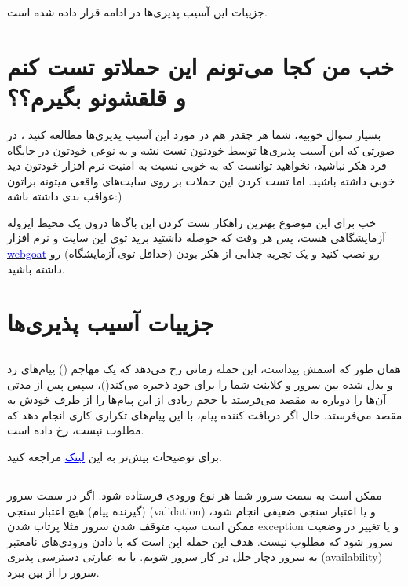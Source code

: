 \documentclass[]{article}
\begin{document}
جزییات این آسیب پذیری‌ها در ادامه قرار داده شده است.




\section*{{\titr خب من کجا می‌تونم این حملاتو تست کنم و قلقشونو بگیرم؟؟}} 

بسیار سوال خوبیه، شما هر چقدر هم در مورد این آسیب پذیری‌ها مطالعه کنید ، در صورتی که این آسیب پذیری‌ها توسط خودتون تست نشه و به نوعی خودتون در جایگاه فرد هکر نباشید، نخواهید توانست که به خوبی نسبت به امنیت نرم افزار خودتون دید خوبی داشته باشید. اما تست کردن این حملات بر روی سایت‌های واقعی میتونه براتون عواقب بدی داشته باشه:)

خب برای این موضوع بهترین راهکار تست کردن این باگ‌ها درون یک محیط ایزوله آزمایشگاهی هست، پس هر وقت که حوصله داشتید برید توی این سایت و نرم افزار \href{https://webgoat.github.io/WebGoat/}{\textcolor{blue} {webgoat}}  رو نصب کنید و یک تجربه جذابی از هکر بودن (حداقل توی آزمایشگاه) رو داشته باشید.



\section*{{\titr جزییات آسیب پذیری‌ها}}


\subsection*{{}}
همان طور که اسمش پیداست، این حمله زمانی رخ می‌دهد که یک مهاجم () پیام‌های رد و بدل شده بین سرور و کلاینت شما را برای خود ذخیره می‌کند()، سپس پس از مدتی آن‌ها را دوباره به مقصد می‌فرستد یا حجم زیادی از این پیام‌ها را از طرف خودش به مقصد می‌فرستد. حال اگر دریافت کننده پیام، با این پیام‌های تکراری کاری انجام دهد که مطلوب نیست،  رخ داده است.

برای توضیحات بیش‌تر به این \href{https://www.kaspersky.com/resource-center/definitions/replay-attack} {\textcolor{blue}{\underline{لینک}}} مراجعه کنید.




\subsection*{{}}
ممکن است به سمت سرور شما هر نوع ورودی فرستاده شود. اگر در سمت سرور (گیرنده پیام) هیچ اعتبار سنجی (validation)‌ و یا اعتبار سنجی ضعیفی انجام شود،‌ ممکن است سبب متوقف شدن سرور  مثلا پرتاب شدن exception و یا تغییر در وضعیت سرور شود که مطلوب نیست. هدف این حمله این است که با دادن ورودی‌های نامعتبر به سرور دچار خلل در کار سرور شویم. یا به عبارتی دسترسی پذیری (‌availability)‌ سرور را از بین ببرد.
\bigskip
\end{document}
